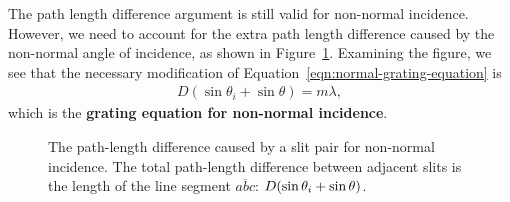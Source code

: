 \documentclass[]{manual}
\begin{document}
    The path length difference argument is still valid for non-normal incidence.
    However, we need to account for the extra path length difference caused by the non-normal angle of incidence, as shown in Figure~\ref{fig:path-length-difference-non-normal}.
    Examining the figure, we see that the necessary modification of Equation~\eqref{eqn:normal-grating-equation} is
    \begin{align} \label{eqn:non-normal-grating-equation}
        D(\sin\theta_i + \sin\theta) = m \lambda,
    \end{align}
    which is the \textbf{grating equation for non-normal incidence}.

    \begin{figure}[H]
        \centering


        \caption[Path-Length Difference for Non-Normal Incidence]{
            The path-length difference caused by a slit pair for non-normal incidence.
            The total path-length difference between adjacent slits is the length of the line segment $\overline{abc}$: $D\qty(\sin\theta_i + \sin\theta)$.
        }

        \label{fig:path-length-difference-non-normal}
    \end{figure}
\end{document}
